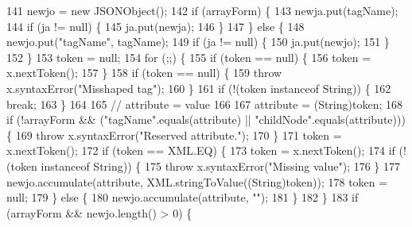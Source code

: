 \begin{DoxyCode}
141                     newjo = \textcolor{keyword}{new} JSONObject();
142                     \textcolor{keywordflow}{if} (arrayForm) \{
143                         newja.put(tagName);
144                         \textcolor{keywordflow}{if} (ja != null) \{
145                             ja.put(newja);
146                         \}
147                     \} \textcolor{keywordflow}{else} \{
148                         newjo.put(\textcolor{stringliteral}{"tagName"}, tagName);
149                         \textcolor{keywordflow}{if} (ja != null) \{
150                             ja.put(newjo);
151                         \}
152                     \}
153                     token = null;
154                     \textcolor{keywordflow}{for} (;;) \{
155                         \textcolor{keywordflow}{if} (token == null) \{
156                             token = x.nextToken();
157                         \}
158                         \textcolor{keywordflow}{if} (token == null) \{
159                             \textcolor{keywordflow}{throw} x.syntaxError(\textcolor{stringliteral}{"Misshaped tag"});
160                         \}
161                         \textcolor{keywordflow}{if} (!(token instanceof String)) \{
162                             \textcolor{keywordflow}{break};
163                         \}
164 
165 \textcolor{comment}{// attribute = value}
166 
167                         attribute = (String)token;
168                         \textcolor{keywordflow}{if} (!arrayForm && (\textcolor{stringliteral}{"tagName"}.equals(attribute) || \textcolor{stringliteral}{"childNode"}.equals(attribute))) \{
169                             \textcolor{keywordflow}{throw} x.syntaxError(\textcolor{stringliteral}{"Reserved attribute."});
170                         \}
171                         token = x.nextToken();
172                         \textcolor{keywordflow}{if} (token == XML.EQ) \{
173                             token = x.nextToken();
174                             \textcolor{keywordflow}{if} (!(token instanceof String)) \{
175                                 \textcolor{keywordflow}{throw} x.syntaxError(\textcolor{stringliteral}{"Missing value"});
176                             \}
177                             newjo.accumulate(attribute, XML.stringToValue((String)token));
178                             token = null;
179                         \} \textcolor{keywordflow}{else} \{
180                             newjo.accumulate(attribute, \textcolor{stringliteral}{""});
181                         \}
182                     \}
183                     \textcolor{keywordflow}{if} (arrayForm && newjo.length() > 0) \{

\end{DoxyCode}
